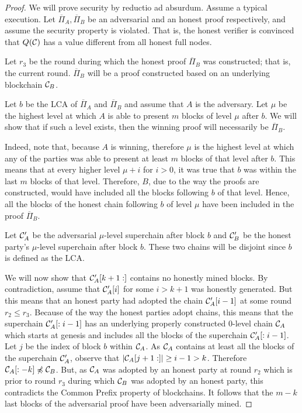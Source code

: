 \begin{proof}
    We will prove security by reductio ad absurdum. Assume a typical execution.
    Let $\overline{\Pi}_A, \overline{\Pi}_B$ be an adversarial and an honest
    proof respectively, and assume the security property is violated. That is,
    the honest verifier is convinced that $Q(\mathcal{C})$ has a value different
    from all honest full nodes.

    Let $r_3$ be the round during which the honest proof $\overline{\Pi}_B$ was
    constructed; that is, the current round. $\overline{\Pi}_B$ will be a proof
    constructed based on an underlying blockchain $\mathcal{C}_B$.

    Let $b$ be the LCA of $\overline{\Pi}_A$ and $\overline{\Pi}_B$ and assume
    that $A$ is the adversary. Let $\mu$ be the highest level at which $A$
    is able to present $m$ blocks of level $\mu$ after $b$. We will show that
    if such a level exists, then the winning proof will necessarily be
    $\overline{\Pi}_B$.

    Indeed, note that, because $A$ is winning, therefore $\mu$ is the highest
    level at which any of the parties was able to present at least $m$ blocks
    of that level after $b$. This means that at every higher level $\mu + i$
    for $i > 0$, it was true that $b$ was within the last $m$ blocks of that
    level.  Therefore, $B$, due to the way the proofs are constructed, would
    have included all the blocks following $b$ of that level. Hence, all the
    blocks of the honest chain following $b$ of level $\mu$ have been included
    in the proof $\overline{\Pi}_B$.

    Let $\mathcal{C}'_A$ be the adversarial $\mu$-level superchain after block $b$
    and $\mathcal{C}'_B$ be the honest party's $\mu$-level superchain after block
    $b$.  These two chains will be disjoint since $b$ is defined as the LCA.

    We will now show that $\mathcal{C}'_A[k + 1:]$ contains no honestly mined
    blocks. By contradiction, assume that $\mathcal{C}'_A[i]$ for some $i > k + 1$
    was honestly generated. But this means that an honest party had adopted the
    chain $\mathcal{C}'_A[i - 1]$ at some round $r_2 \leq r_3$. Because of the way the
    honest parties adopt chains, this means that the superchain $\mathcal{C}'_A[:i -
    1]$ has an underlying properly constructed $0$-level chain $\mathcal{C}_A$ which
    starts at genesis and includes all the blocks of the superchain
    $\mathcal{C}'_A[:i - 1]$. Let $j$ be the index of block $b$ within $\mathcal{C}_A$.
    As $\mathcal{C}_A$ contains at least all the blocks of the superchain
    $\mathcal{C}'_A$, observe that $|\mathcal{C}_A[j + 1:]| \geq i - 1 > k$.
    Therefore $\mathcal{C}_A[:-k] \not\preccurlyeq \mathcal{C}_B$. But, as $\mathcal{C}_A$ was
    adopted by an honest party at round $r_2$ which is prior to round $r_3$
    during which $\mathcal{C}_B$ was adopted by an honest party, this contradicts
    the Common Prefix property of blockchains. It follows that the $m - k$ last
    blocks of the adversarial proof have been adversarially mined.


\end{proof}
